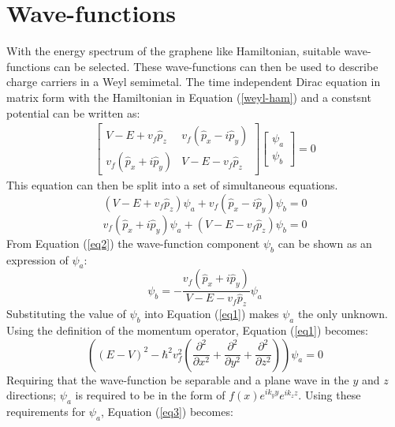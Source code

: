 		\section{Wave-functions}
		\label{Weyl - Wave-functions}
			With the energy spectrum of the graphene like Hamiltonian, suitable wave-functions can be selected. These wave-functions can then be used to describe charge carriers in a Weyl semimetal. The time independent Dirac equation in matrix form with the Hamiltonian in Equation (\ref{weyl-ham}) and a constsnt potential can be written as:
			\begin{align}
				\left[\begin{array}{ccc}
				V-E+v_{f}\hat{p}_{z}&v_{f}\left(\hat{p}_{x}-i\hat{p}_{y}\right)\\
				v_{f}\left(\hat{p}_{x}+i\hat{p}_{y}\right)&V-E-v_{f}\hat{p}_{z}
				\end{array}\right]
				\left[\begin{array}{ccc}
				\psi_a\\
				\psi_b
				\end{array}\right]
				=0
			\end{align}
			This equation can then be split into a set of simultaneous equations.
			\begin{equation}
				\left(V-E+v_{f}\hat{p}_{z}\right)\psi_{a}+v_{f}\left(\hat{p}_{x}-i\hat{p}_{y}\right)\psi_{b}=0
				\label{eq1}
			\end{equation}
			\begin{equation}
				v_{f}\left(\hat{p}_{x}+i\hat{p}_{y}\right)\psi_{a}+\left(V-E-v_{f}\hat{p}_{z}\right)\psi_{b}=0
				\label{eq2}
			\end{equation}
			From Equation (\ref{eq2}) the wave-function component $\psi_{b}$ can be shown as an expression of $\psi_{a}$:
			\begin{equation}
				\psi_{b}= -\frac{v_{f}\left(\hat{p}_{x}+i\hat{p}_{y}\right)}{V-E-v_{f}\hat{p}_{z}}\psi_{a}
				\label{weyl-psi-b}
			\end{equation}
			Substituting the value of $\psi_{b}$ into Equation (\ref{eq1}) makes $\psi_{a}$ the only unknown. Using the definition of the momentum operator, Equation (\ref{eq1}) becomes:
			\begin{equation}
				\left(\left(E-V\right)^{2}-\hbar^{2}v_{f}^{2}\left(\frac{\partial^{2}}{\partial x^{2}}+\frac{\partial^{2}}{\partial y^{2}}+\frac{\partial^{2}}{\partial z^{2}}\right)\right)\psi_{a}=0
				\label{eq3}
			\end{equation}
			Requiring that the wave-function be separable and a plane wave in the $y$ and $z$ directions; $\psi_{a}$ is required to be in the form of $f(x)e^{ik_{y}y}e^{ik_{z}z}$. Using these requirements for $\psi_{a}$, Equation (\ref{eq3}) becomes:
